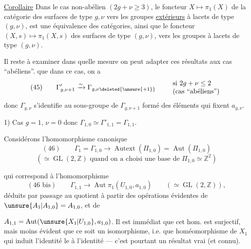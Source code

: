 \uline{Corollaire} Dans le cas non-abélien $(2g+\nu\geq3)$, le foncteur $X\longmapsto\pi_1(X)$ de la catégorie  des surfaces de type $g,\nu$ vers les groupes \uline{extérieurs} à lacets de type $(g,\nu)$, est une équivalence des catégories, ainsi que le foncteur $(X,s)\longmapsto\pi_1(X,s)$  des surfaces  de type $(g,\nu)$, vers les groupes à lacets de type $(g,\nu)$.


Il reste à examiner dans quelle mesure on peut adapter ces résultats aux cas ``abéliens''.   que dans ce cas, on a
\[
(45)\qquad \Gamma'_{g,\nu+1}\xrightarrow{\sim}\Gamma_{g,\nu\deleted{\unsure{+1}}}
\qquad\begin{array}{l}
\text{si }2g+\nu\leq2\\
\text{(cas ``abéliens'')}
\end{array}
\]
donc $\Gamma_{g,\nu}$ s'identifie au sous-groupe de $\Gamma_{g,\nu+1}$ formé des éléments qui fixent $a_{g,\nu}$.

1) Cas $g=1$, $\nu=0$ donc $\Gamma_{1,0}\simeq\Gamma'_{1,1}=\Gamma_{1,1}$.

Considérons l'homomorphisme canonique
\[
(46)\qquad \Gamma_1=\Gamma_{1,0}\longrightarrow\operatorname{Autext}(\Pi_{1,0})=\operatorname{Aut}(\Pi_{1,0})
\]
\[
(\simeq\operatorname{GL}(2,\mathbb{Z})\text{ quand on a choisi une base de }\Pi_{1,0}\simeq\mathbb{Z}^2)
\]

qui correspond à l'homomorphisme
\[
(46\text{ bis})\qquad\Gamma_{1,1}\longrightarrow\operatorname{Aut}\pi_1(U_{1,0},a_{1,0})
\qquad(\simeq\operatorname{GL}(2,\mathbb{Z})),
\]
déduits  par passage au quotient à partir des  opérations évidentes de $\unsure{A_1|A_{1,0}}=A_{1,0}$, et de

$A_{1,1}=\operatorname{Aut}(\unsure{X_1|U_{1,0}},a_{1,0})$.
Il est immédiat que cet hom. est surjectif, mais moins évident que ce soit un isomorphisme, i.e. que  homéomorphisme de $X_1$ qui induit l'identité  le    à l'identité --- c'est pourtant un résultat vrai (et connu).

